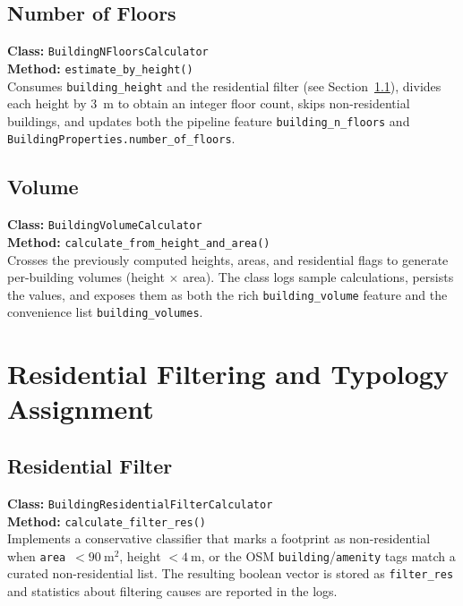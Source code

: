 \subsection{Number of Floors}
\textbf{Class:} \texttt{BuildingNFloorsCalculator}\\
\textbf{Method:} \texttt{estimate\_by\_height()}\\
Consumes \texttt{building\_height} and the residential filter (see
Section~\ref{sec:resfilter}), divides each height by 3~m to obtain an
integer floor count, skips non-residential buildings, and updates both
the pipeline feature \texttt{building\_n\_floors} and
\texttt{BuildingProperties.number\_of\_floors}.

\subsection{Volume}
\textbf{Class:} \texttt{BuildingVolumeCalculator}\\
\textbf{Method:} \texttt{calculate\_from\_height\_and\_area()}\\
Crosses the previously computed heights, areas, and residential flags to
generate per-building volumes (height $\times$ area). The class logs
sample calculations, persists the values, and exposes them as both the
rich \texttt{building\_volume} feature and the convenience list
\texttt{building\_volumes}.

\section{Residential Filtering and Typology Assignment}
\subsection{Residential Filter}
\label{sec:resfilter}
\textbf{Class:} \texttt{BuildingResidentialFilterCalculator}\\
\textbf{Method:} \texttt{calculate\_filter\_res()}\\
Implements a conservative classifier that marks a footprint as
non-residential when \texttt{area}~$<90~\mathrm{m}^2$, height
${}<4~\mathrm{m}$, or the OSM \texttt{building}/\texttt{amenity} tags
match a curated non-residential list. The resulting boolean vector is
stored as \texttt{filter\_res} and statistics about filtering causes are
reported in the logs.

